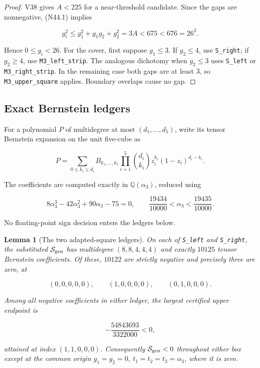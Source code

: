 \documentclass[11pt]{article}
\newtheorem{lemma}[theorem]{Lemma}
\theoremstyle{definition}
\theoremstyle{remark}
\begin{document}
\begin{proof}
V38 gives \(A<225\) for a near-threshold candidate.  Since the gaps are
nonnegative, \textup{(N44.1)} implies

\[
 g_i^2\leq g_1^2+g_1g_2+g_2^2=3A<675<676=26^2.
\tag{N44.5}
\]

Hence \(0\leq g_i<26\).  For the cover, first suppose \(g_1\leq3\).
If \(g_2\leq4\), use \texttt{S\_right}; if \(g_2\geq4\), use
\texttt{M3\_left\_strip}.  The analogous dichotomy when \(g_2\leq3\)
uses \texttt{S\_left} or \texttt{M3\_right\_strip}.  In the remaining
case both gaps are at least \(3\), so
\texttt{M3\_upper\_square} applies.  Boundary overlaps cause no gap.
\end{proof}

\subsection{Exact Bernstein ledgers}

For a polynomial \(P\) of multidegree at most
\((d_1,\ldots,d_5)\), write its tensor Bernstein expansion on the unit
five-cube as

\[
 P=\sum_{0\leq k_i\leq d_i}
 B_{k_1,\ldots,k_5}
 \prod_{i=1}^5\binom{d_i}{k_i}z_i^{k_i}(1-z_i)^{d_i-k_i}.
\tag{N44.6}
\]

The coefficients are computed exactly in
\(\mathbb Q(\alpha_3)\), reduced using

\[
 8\alpha_3^3-42\alpha_3^2+90\alpha_3-75=0,
 \qquad
 \frac{19434}{10000}<\alpha_3<\frac{19435}{10000}.
\tag{N44.7}
\]

No floating-point sign decision enters the ledgers below.

\begin{lemma}[The two adapted-square ledgers]
\label{lem:f2v44-s-ledgers}
On each of \texttt{S\_left} and \texttt{S\_right}, the substituted
\(\mathcal S_{\rm gen}\) has multidegree \((8,8,4,4,4)\) and exactly
\(10125\) tensor Bernstein coefficients.  Of these, \(10122\) are
strictly negative and precisely three are zero, at

\[
 (0,0,0,0,0),\qquad (1,0,0,0,0),\qquad (0,1,0,0,0).
\tag{N44.8}
\]

Among all negative coefficients in either ledger, the largest certified
upper endpoint is

\[
 -\frac{54843693}{3322000}<0,
\tag{N44.9}
\]

attained at index \((1,1,0,0,0)\).  Consequently
\(\mathcal S_{\rm gen}<0\) throughout either box except at the common
origin \(g_1=g_2=0,\ t_1=t_2=t_3=\alpha_3\), where it is zero.
\end{lemma}
\end{document}
